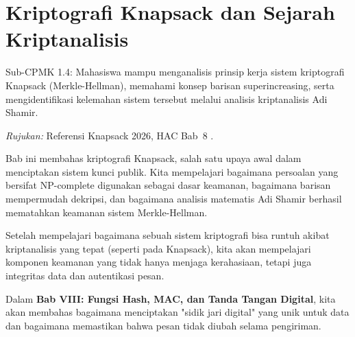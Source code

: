 \documentclass[main.tex]{subfiles}
\begin{document}
\chapter{Kriptografi Knapsack dan Sejarah Kriptanalisis}

\begin{subcpmk}
  \item Sub-CPMK 1.4: Mahasiswa mampu menganalisis prinsip kerja sistem kriptografi Knapsack (Merkle-Hellman), memahami konsep barisan superincreasing, serta mengidentifikasi kelemahan sistem tersebut melalui analisis kriptanalisis Adi Shamir.
\end{subcpmk}

\noindent\textit{Rujukan:} Referensi Knapsack 2026, HAC Bab~8 \cite{hac_online}.






\begin{rangkuman}
Bab ini membahas kriptografi Knapsack, salah satu upaya awal dalam menciptakan sistem kunci publik. Kita mempelajari bagaimana persoalan  yang bersifat NP-complete digunakan sebagai dasar keamanan, bagaimana barisan  mempermudah dekripsi, dan bagaimana analisis matematis Adi Shamir berhasil mematahkan keamanan sistem Merkle-Hellman.
\end{rangkuman}


\begin{transition}
Setelah mempelajari bagaimana sebuah sistem kriptografi bisa runtuh akibat kriptanalisis yang tepat (seperti pada Knapsack), kita akan mempelajari komponen keamanan yang tidak hanya menjaga kerahasiaan, tetapi juga integritas data dan autentikasi pesan.

Dalam \textbf{Bab VIII: Fungsi Hash, MAC, dan Tanda Tangan Digital}, kita akan membahas bagaimana menciptakan "sidik jari digital" yang unik untuk data dan bagaimana memastikan bahwa pesan tidak diubah selama pengiriman.
\end{transition}

\ifSubfilesClassLoaded{
  \renewcommand{\bibname}{Daftar Pustaka}
  
  
}{}
\end{document}
